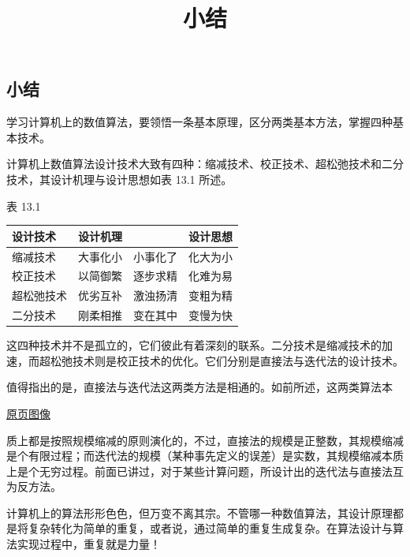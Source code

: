 \documentclass[
  10pt,
  fontset=fandol]{ctexart}
\title{小结}
\author{}
\date{}
\newcounter{none} %
\begin{document}
\maketitle

\subsection{小结}\label{ux5c0fux7ed3}

学习计算机上的数值算法，要领悟一条基本原理，区分两类基本方法，掌握四种基本技术。

计算机上数值算法设计技术大致有四种：缩减技术、校正技术、超松弛技术和二分技术，其设计机理与设计思想如表 13.1 所述。

表 13.1

{\def\LTcaptype{none} %
\begin{longtable}[]{@{}lll@{}}
\toprule\noalign{}
设计技术 & 设计机理 & 设计思想 \\
\midrule\noalign{}
\endhead
\bottomrule\noalign{}
\endlastfoot
缩减技术 & 大事化小　小事化了 & 化大为小 \\
校正技术 & 以简御繁　逐步求精 & 化难为易 \\
超松弛技术 & 优劣互补　激浊扬清 & 变粗为精 \\
二分技术 & 刚柔相推　变在其中 & 变慢为快 \\
\end{longtable}
}

这四种技术并不是孤立的，它们彼此有着深刻的联系。二分技术是缩减技术的加速，而超松弛技术则是校正技术的优化。它们分别是直接法与迭代法的设计技术。

值得指出的是，直接法与迭代法这两类方法是相通的。如前所述，这两类算法本

\href{../../source-images/pdf-317.jpeg}{原页图像}

质上都是按照规模缩减的原则演化的，不过，直接法的规模是正整数，其规模缩减是个有限过程；而迭代法的规模（某种事先定义的误差）是实数，其规模缩减本质上是个无穷过程。前面已讲过，对于某些计算问题，所设计出的迭代法与直接法互为反方法。

计算机上的算法形形色色，但万变不离其宗。不管哪一种数值算法，其设计原理都是将复杂转化为简单的重复，或者说，通过简单的重复生成复杂。在算法设计与算法实现过程中，重复就是力量！
\end{document}

